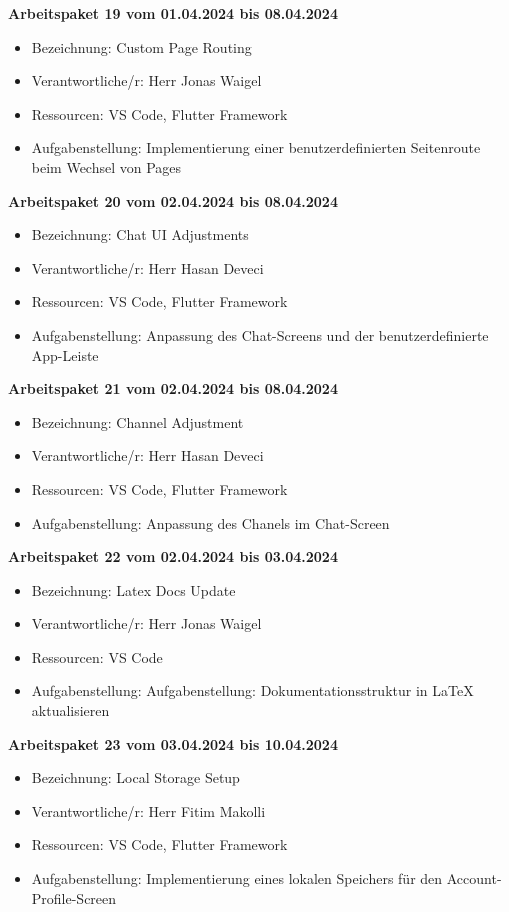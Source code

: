 \textbf{Arbeitspaket 19 vom 01.04.2024 bis 08.04.2024}
\begin{itemize}[itemsep=0pt]
    \item{Bezeichnung: Custom Page Routing} 
	\item{Verantwortliche/r: Herr Jonas Waigel} 
	\item{Ressourcen: VS Code, Flutter Framework} 
    \item{Aufgabenstellung: Implementierung einer benutzerdefinierten Seitenroute beim Wechsel von Pages}
\end{itemize} 

\textbf{Arbeitspaket 20 vom 02.04.2024 bis 08.04.2024}
\begin{itemize}[itemsep=0pt]
    \item{Bezeichnung: Chat UI Adjustments} 
	\item{Verantwortliche/r: Herr Hasan Deveci} 
	\item{Ressourcen: VS Code, Flutter Framework} 
    \item{Aufgabenstellung: Anpassung des Chat-Screens und der benutzerdefinierte App-Leiste}
\end{itemize}

\textbf{Arbeitspaket 21 vom 02.04.2024 bis 08.04.2024}
\begin{itemize}[itemsep=0pt]
    \item{Bezeichnung: Channel Adjustment} 
	\item{Verantwortliche/r: Herr Hasan Deveci} 
	\item{Ressourcen: VS Code, Flutter Framework} 
    \item{Aufgabenstellung: Anpassung des Chanels im Chat-Screen}
\end{itemize}

\textbf{Arbeitspaket 22 vom 02.04.2024 bis 03.04.2024}
\begin{itemize}[itemsep=0pt]
    \item{Bezeichnung: Latex Docs Update} 
	\item{Verantwortliche/r: Herr Jonas Waigel} 
	\item{Ressourcen: VS Code} 
    \item{Aufgabenstellung: Aufgabenstellung: Dokumentationsstruktur in LaTeX aktualisieren}
\end{itemize} 

\textbf{Arbeitspaket 23 vom 03.04.2024 bis 10.04.2024}
\begin{itemize}[itemsep=0pt]
    \item{Bezeichnung: Local Storage Setup} 
	\item{Verantwortliche/r: Herr Fitim Makolli} 
	\item{Ressourcen: VS Code, Flutter Framework} 
    \item{Aufgabenstellung: Implementierung eines lokalen Speichers für den Account-Profile-Screen}
\end{itemize}


